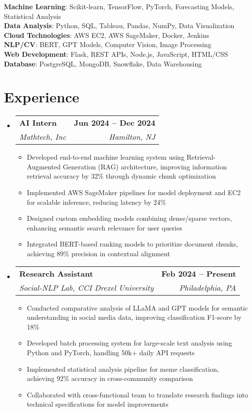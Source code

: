 \documentclass[letterpaper,11pt]{article}
\makeatletter
\newcommand{\resumeItem}[1]{
  \item\small{
    {#1 \vspace{-2pt}}
  }
}
\newcommand{\resumeSubheading}[4]{
  \vspace{-2pt}\item
    \begin{tabular*}{1.0\textwidth}[t]{l@{\extracolsep{\fill}}r}
      \textbf{#1} & \textbf{\small #2} \\
      \textit{\small#3} & \textit{\small #4} \\
    \end{tabular*}\vspace{-7pt}
}
\newcommand{\resumeSubHeadingListStart}{\begin{itemize}[leftmargin=0.0in, label={}]}
\newcommand{\resumeSubHeadingListEnd}{\end{itemize}}
\newcommand{\resumeItemListStart}{\begin{itemize}}
\newcommand{\resumeItemListEnd}{\end{itemize}\vspace{-5pt}}
\makeatother
\begin{document}
\begin{itemize}[leftmargin=0.15in, label={}]
	\small{\item{
		\textbf{Machine Learning}{: Scikit-learn, TensorFlow, PyTorch, Forecasting Models, Statistical Analysis} \\
		\textbf{Data Analysis}{: Python, SQL, Tableau, Pandas, NumPy, Data Visualization} \\
		\textbf{Cloud Technologies}{: AWS EC2, AWS SageMaker, Docker, Jenkins} \\
		\textbf{NLP/CV}{: BERT, GPT Models, Computer Vision, Image Processing} \\
		\textbf{Web Development}{: Flask, REST APIs, Node.js, JavaScript, HTML/CSS} \\
		\textbf{Database}{: PostgreSQL, MongoDB, Snowflake, Data Warehousing}}
	}
\end{itemize}
\vspace{-15pt}

\section{Experience}
  \resumeSubHeadingListStart
    \resumeSubheading
    {AI Intern}{Jun 2024 -- Dec 2024}
    {Mathtech, Inc}{Hamilton, NJ}
    \resumeItemListStart
        \resumeItem{Developed end-to-end machine learning system using Retrieval-Augmented Generation (RAG) architecture, improving information retrieval accuracy by 32\% through dynamic chunk optimization}
        \resumeItem{Implemented AWS SageMaker pipelines for model deployment and EC2 for scalable inference, reducing latency by 24\%}
        \resumeItem{Designed custom embedding models combining dense/sparse vectors, enhancing semantic search relevance for user queries}
        \resumeItem{Integrated BERT-based ranking models to prioritize document chunks, achieving 89\% precision in contextual alignment}
    \resumeItemListEnd
    \resumeSubheading
    {Research Assistant}{Feb 2024 -- Present}
    {Social-NLP Lab, CCI Drexel University}{Philadelphia, PA}
    \resumeItemListStart
        \resumeItem{Conducted comparative analysis of LLaMA and GPT models for semantic understanding in social media data, improving classification F1-score by 18\%}
        \resumeItem{Developed batch processing system for large-scale text analysis using Python and PyTorch, handling 50k+ daily API requests}
        \resumeItem{Implemented statistical analysis pipeline for meme classification, achieving 92\% accuracy in cross-community comparison}
        \resumeItem{Collaborated with cross-functional team to translate research findings into technical specifications for model improvements}
    \resumeItemListEnd
\resumeSubHeadingListEnd
\vspace{-15pt}
\end{document}

